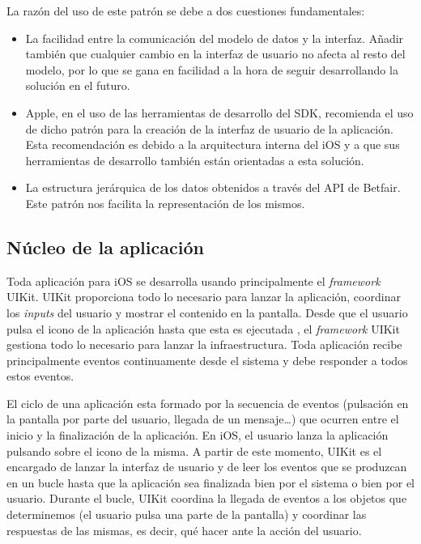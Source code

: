   La razón del uso de este patrón se debe a dos cuestiones fundamentales:
\begin{itemize}
	\item La facilidad entre la comunicación del %
	modelo de datos y la interfaz. Añadir también que cualquier cambio en la interfaz de usuario no afecta al resto del modelo, por lo que se gana en facilidad a la hora de seguir desarrollando la solución en el futuro.
	\item Apple, en el uso de las herramientas de desarrollo del SDK, recomienda el uso de dicho patrón para la creación de la interfaz de usuario de la aplicación. Esta recomendación es debido a la arquitectura interna del iOS y a que sus herramientas de desarrollo también están orientadas a esta solución.
	\item La estructura jerárquica de los datos obtenidos a través del API de Betfair. Este patrón nos facilita la representación de los mismos.
\end{itemize}


\subsection{Núcleo de la aplicación}
	Toda aplicación para iOS se desarrolla usando principalmente el \emph{framework} UIKit. UIKit proporciona todo lo necesario para lanzar la aplicación, coordinar los \emph{inputs} del usuario y mostrar el contenido en la pantalla. 
	Desde que el usuario pulsa el icono de la aplicación hasta que esta es ejecutada , el \emph{framework} UIKit gestiona todo lo necesario para lanzar la infraestructura. Toda aplicación recibe principalmente eventos continuamente desde el sistema y debe responder a todos estos eventos. 
	
	El ciclo %
	de una aplicación esta formado por la secuencia de eventos (pulsación en la pantalla por parte del usuario, llegada de un mensaje\ldots ) %
	 que ocurren entre el inicio %
	 y la finalización de la aplicación. En iOS, el usuario lanza la aplicación pulsando sobre el icono de la misma.  A partir de este momento, UIKit es el encargado de lanzar la interfaz de usuario y de leer los eventos que se produzcan en un bucle hasta que la aplicación sea finalizada bien por el sistema o bien por el usuario. Durante el bucle, UIKit coordina la llegada de eventos a los objetos que determinemos (el usuario pulsa una parte de la pantalla) %
	 y coordinar las respuestas %
	 de las mismas, es decir, qué hacer ante la acción del usuario. 
	     
